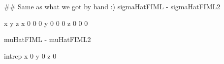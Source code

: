 \begin{Schunk}
\begin{Sinput}
 ## Same as what we got by hand :)
 sigmaHatFIML - sigmaHatFIML2
\end{Sinput}
\begin{Soutput}
  x y z
x 0 0 0
y 0 0 0
z 0 0 0
\end{Soutput}
\begin{Sinput}
 muHatFIML - muHatFIML2
\end{Sinput}
\begin{Soutput}
  intrcp
x      0
y      0
z      0
\end{Soutput}
\end{Schunk}
